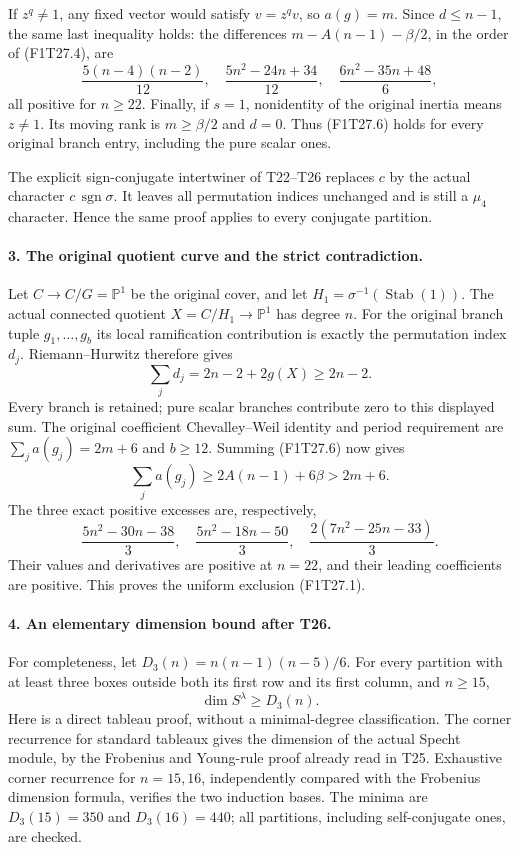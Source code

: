 If $z^q\ne1$, any fixed vector would satisfy
$v=z^qv$, so $a(g)=m$. Since $d\le n-1$, the same
last inequality holds: the differences
$m-A(n-1)-\beta/2$, in the order of (F1T27.4), are
\[
 \frac{5(n-4)(n-2)}{12},\quad
 \frac{5n^2-24n+34}{12},\quad
 \frac{6n^2-35n+48}{6},
 \tag{F1T27.7}
\]
all positive for $n\ge22$.
Finally, if $s=1$, nonidentity of the original inertia
means $z\ne1$. Its moving rank is $m\ge\beta/2$ and
$d=0$. Thus (F1T27.6) holds for every original branch
entry, including the pure scalar ones.

The explicit sign-conjugate intertwiner of T22--T26
replaces $c$ by the actual character
$c\,\operatorname{sgn}\sigma$. It leaves all permutation
indices unchanged and is still a $\mu_4$ character.
Hence the same proof applies to every conjugate partition.

\paragraph{3. The original quotient curve and the strict contradiction.}
Let $C\to C/G=\mathbb P^1$ be the original cover,
and let $H_1=\sigma^{-1}(\operatorname{Stab}(1))$.
The actual connected quotient $X=C/H_1\to\mathbb P^1$
has degree $n$. For the original branch tuple
$g_1,\ldots,g_b$ its local ramification contribution is
exactly the permutation index $d_j$.
Riemann--Hurwitz therefore gives
\[
 \sum_jd_j=2n-2+2g(X)\ge2n-2.
 \tag{F1T27.8}
\]
Every branch is retained; pure scalar branches contribute
zero to this displayed sum. The original coefficient
Chevalley--Weil identity and period requirement are
$\sum_j a(g_j)=2m+6$ and $b\ge12$.
Summing (F1T27.6) now gives
\[
 \sum_j a(g_j)\ge2A(n-1)+6\beta>2m+6.
 \tag{F1T27.9}
\]
The three exact positive excesses are, respectively,
\[
 \frac{5n^2-30n-38}{3},\quad
 \frac{5n^2-18n-50}{3},\quad
 \frac{2(7n^2-25n-33)}3 .
 \tag{F1T27.10}
\]
Their values and derivatives are positive at $n=22$,
and their leading coefficients are positive. This proves
the uniform exclusion (F1T27.1).

\paragraph{4. An elementary dimension bound after T26.}
For completeness, let $D_3(n)=n(n-1)(n-5)/6$.
For every partition with at least three boxes outside
both its first row and its first column, and $n\ge15$,
\[
                        \dim S^\lambda\ge D_3(n).
 \tag{F1T27.11}
\]
Here is a direct tableau proof, without a minimal-degree
classification. The corner recurrence for standard
tableaux gives the dimension of the actual Specht
module, by the Frobenius and Young-rule proof already
read in T25. Exhaustive corner recurrence for $n=15,16$,
independently compared with the Frobenius dimension
formula, verifies the two induction bases.
The minima are $D_3(15)=350$ and $D_3(16)=440$;
all partitions, including self-conjugate ones, are checked.

